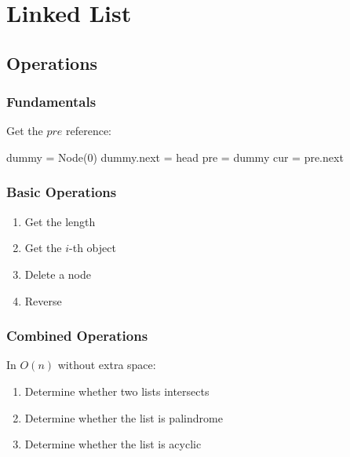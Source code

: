 \chapter{Linked List}


\section{Operations}
\subsection{Fundamentals}
Get the $pre$ reference:
\begin{python}
dummy = Node(0)
dummy.next = head
pre = dummy
cur = pre.next
\end{python}

\subsection{Basic Operations}
\begin{enumerate}
\item Get the length
\item Get the $i$-th object
\item Delete a node 
\item Reverse
\end{enumerate}

\subsection{Combined Operations}
In $O(n)$ without extra space:
\begin{enumerate}
\item Determine whether two lists intersects
\item Determine whether the list is palindrome 
\item Determine whether the list is acyclic 
\end{enumerate}
